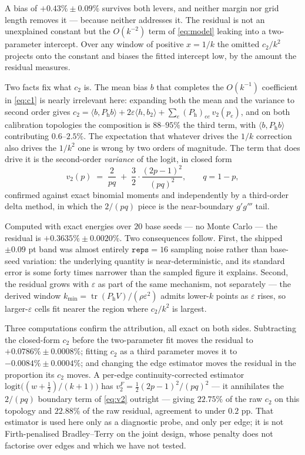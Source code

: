 \documentclass[11pt,a4paper]{article}
\newcommand{\tr}{\operatorname{tr}}
\newcommand{\Ph}{P_{\mathrm{h}}}
\begin{document}
A bias of $+0.43\% \pm 0.09\%$ survives both levers, and neither margin nor grid
length removes it --- because neither addresses it. The residual is not an
unexplained constant but the $O(k^{-2})$ term of \eqref{eq:model} leaking into a
two-parameter intercept. Over any window of positive $x=1/k$ the omitted
$c_2/k^2$ projects onto the constant and biases the fitted intercept low, by the
amount the residual measures.

Two facts fix what $c_2$ is. The mean bias $b$ that completes the $O(k^{-1})$
coefficient in \eqref{eq:c1} is nearly irrelevant here: expanding both the mean
and the variance to second order gives
$c_2 = \langle b,\Ph b\rangle + 2\varepsilon\langle h,b_2\rangle + \sum_e
(\Ph)_{ee}\,v_2(p_e)$, and on both calibration topologies the composition is
$88$--$95\%$ the third term, with $\langle b,\Ph b\rangle$ contributing
$0.6$--$2.5\%$. The expectation that whatever
drives the $1/k$ correction also drives the $1/k^2$ one is wrong by two orders of
magnitude. The term that does drive it is the second-order \emph{variance} of the
logit, in closed form
\begin{equation}
v_2(p) \;=\; \frac{2}{pq} \;+\; \frac{3}{2}\cdot\frac{(2p-1)^2}{(pq)^2},
\qquad q = 1-p,
\label{eq:v2}
\end{equation}
confirmed against exact binomial moments and independently by a third-order delta
method, in which the $2/(pq)$ piece is the near-boundary $g'g'''$ tail.

Computed with exact energies over $20$ base seeds --- no Monte Carlo --- the
residual is $+0.3635\% \pm 0.0020\%$. Two consequences follow. First, the shipped
$\pm 0.09$ pt band was almost entirely $\texttt{reps}=16$ sampling noise rather
than base-seed variation: the underlying quantity is near-deterministic, and its
standard error is some forty times narrower than the sampled figure it explains.
Second, the residual grows with $\varepsilon$ as part of the same mechanism, not
separately --- the derived window $k_{\min} = \tr(\Ph V)/(\rho\varepsilon^2)$
admits lower-$k$ points as $\varepsilon$ rises, so larger-$\varepsilon$ cells fit
nearer the region where $c_2/k^2$ is largest.

Three computations confirm the attribution, all exact on both sides. Subtracting
the closed-form $c_2$ before the two-parameter fit moves the residual to
$+0.0786\% \pm 0.0008\%$; fitting $c_2$ as a third parameter moves it to
$-0.0084\% \pm 0.0004\%$; and changing the edge estimator moves the residual in
the proportion its $c_2$ moves. A per-edge continuity-corrected estimator
$\mathrm{logit}\big((w+\tfrac12)/(k+1)\big)$ has $v_2^F = \tfrac12
(2p-1)^2/(pq)^2$ --- it annihilates the $2/(pq)$ boundary term of \eqref{eq:v2}
outright --- giving $22.75\%$ of the raw $c_2$ on this topology and $22.88\%$ of
the raw residual, agreement to under $0.2$ pp. That estimator is used here only as
a diagnostic probe, and only per edge; it is not Firth-penalised Bradley--Terry
on the joint design, whose penalty does not factorise over edges and which we
have not tested.
\end{document}
